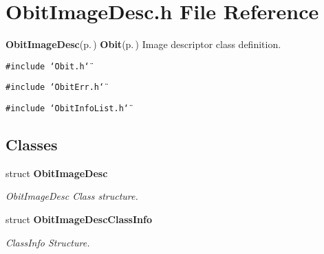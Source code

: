 \section{Obit\-Image\-Desc.h File Reference}
\label{ObitImageDesc_8h}
{\bf Obit\-Image\-Desc}{\rm (p.\,\pageref{structObitImageDesc})} {\bf Obit}{\rm (p.\,\pageref{structObit})} Image descriptor class definition. 

{\tt \#include \char`\"{}Obit.h\char`\"{}}\par
{\tt \#include \char`\"{}Obit\-Err.h\char`\"{}}\par
{\tt \#include \char`\"{}Obit\-Info\-List.h\char`\"{}}\par
\subsection*{Classes}
\begin{CompactItemize}
\item 
struct {\bf Obit\-Image\-Desc}
\begin{CompactList}\small\item\em Obit\-Image\-Desc Class structure. \item\end{CompactList}\item 
struct {\bf Obit\-Image\-Desc\-Class\-Info}
\begin{CompactList}\small\item\em Class\-Info Structure. \item\end{CompactList}\end{CompactItemize}

